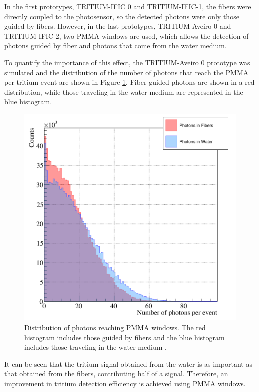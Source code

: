 In the first prototypes, TRITIUM-IFIC 0 and TRITIUM-IFIC-1, the fibers were directly coupled to the photosensor, so the detected photons were only those guided by fibers. However, in the last prototypes, TRITIUM-Aveiro 0 and TRITIUM-IFIC 2, two PMMA windows are used, which allows the detection of photons guided by fiber and photons that come from the water medium.

To quantify the importance of this effect, the TRITIUM-Aveiro 0 prototype was simulated and the distribution of the number of photons that reach the PMMA per tritium event are shown in Figure \ref{fig:PMMAEffect}. Fiber-guided photons are shown in a red distribution, while those traveling in the water medium are represented in the blue histogram.

\begin{figure}[hbtp]
\centering
\includegraphics[scale=0.3]{Figures/8SimulationsResults/81TRITIUMDesign/815PMMA/PhotonsDetectedWaterFiber.png}
\caption{Distribution of photons reaching PMMA windows. The red histogram includes those guided by fibers and the blue histogram includes those traveling in the water medium \cite{SimulationPaperCarlos}.\label{fig:PMMAEffect}}
\end{figure}

It can be seen that the tritium signal obtained from the water is as important as that obtained from the fibers, contributing half of a signal. Therefore, an improvement in tritium detection efficiency is achieved using PMMA windows.